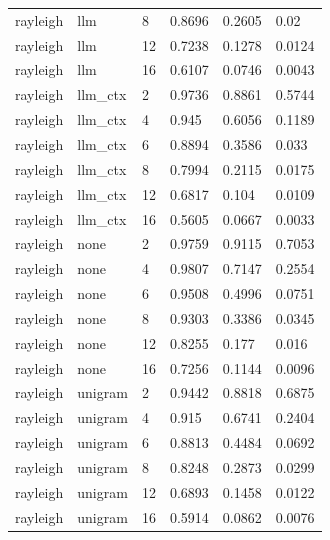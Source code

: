 \begin{tabular}{llllll}
rayleigh & llm & 8 & 0.8696 & 0.2605 & 0.02 \\
rayleigh & llm & 12 & 0.7238 & 0.1278 & 0.0124 \\
rayleigh & llm & 16 & 0.6107 & 0.0746 & 0.0043 \\
rayleigh & llm\_ctx & 2 & 0.9736 & 0.8861 & 0.5744 \\
rayleigh & llm\_ctx & 4 & 0.945 & 0.6056 & 0.1189 \\
rayleigh & llm\_ctx & 6 & 0.8894 & 0.3586 & 0.033 \\
rayleigh & llm\_ctx & 8 & 0.7994 & 0.2115 & 0.0175 \\
rayleigh & llm\_ctx & 12 & 0.6817 & 0.104 & 0.0109 \\
rayleigh & llm\_ctx & 16 & 0.5605 & 0.0667 & 0.0033 \\
rayleigh & none & 2 & 0.9759 & 0.9115 & 0.7053 \\
rayleigh & none & 4 & 0.9807 & 0.7147 & 0.2554 \\
rayleigh & none & 6 & 0.9508 & 0.4996 & 0.0751 \\
rayleigh & none & 8 & 0.9303 & 0.3386 & 0.0345 \\
rayleigh & none & 12 & 0.8255 & 0.177 & 0.016 \\
rayleigh & none & 16 & 0.7256 & 0.1144 & 0.0096 \\
rayleigh & unigram & 2 & 0.9442 & 0.8818 & 0.6875 \\
rayleigh & unigram & 4 & 0.915 & 0.6741 & 0.2404 \\
rayleigh & unigram & 6 & 0.8813 & 0.4484 & 0.0692 \\
rayleigh & unigram & 8 & 0.8248 & 0.2873 & 0.0299 \\
rayleigh & unigram & 12 & 0.6893 & 0.1458 & 0.0122 \\
rayleigh & unigram & 16 & 0.5914 & 0.0862 & 0.0076 \\
\hline
\end{tabular}

